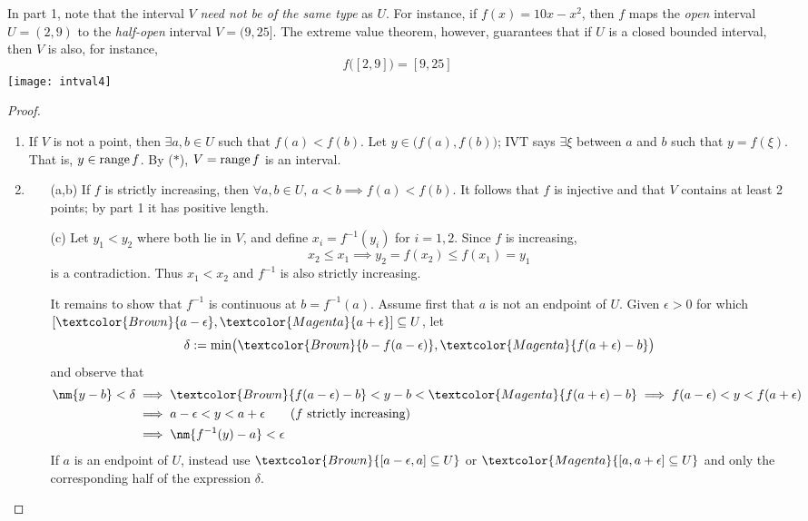 \begin{example}[lower separated=false, sidebyside, sidebyside align=top seam, sidebyside gap=0pt, righthand width=0.3\linewidth]{}{}
	In part 1, note that the interval $V$ \emph{need not be of the same type} as $U$. For instance, if $f(x)=10x-x^2$, then $f$ maps the \emph{open} interval $U=(2,9)$ to the \emph{half-open} interval $V=(9,25]$.\smallbreak
	The extreme value theorem, however, guarantees that if $U$ is a closed bounded interval, then $V$ is also, for instance,
	\[
		f\bigl([2,9]\bigr)=[9,25]
	\]
	\tcblower
	\flushright\texttt{[image: intval4]}
\end{example}


\begin{proof}
\begin{enumerate}
  \item If $V$ is not a point, then $\exists a,b\in U$ such that $f(a)<f(b)$. Let $y\in\bigl(f(a),f(b)\bigr)$; IVT says $\exists\xi$ between $a$ and $b$ such that $y=f(\xi)$. That is, $y\in \operatorname{range} f$. By ($\ast$), $V=\operatorname{range} f$ is an interval.
  \item\begin{enumerate}
    \item[(a,b)] If $f$ is strictly increasing, then $\forall a,b\in U,\ a<b\implies f(a)<f(b)$. It follows that $f$ is injective and that $V$ contains at least 2 points; by part 1 it has positive length.
    \item[(c)] Let $y_1<y_2$ where both lie in $V$, and define $x_i=f^{-1}(y_i)$ for $i=1,2$. Since $f$ is increasing,
		\[
			x_2\le x_1\implies y_2=f(x_2)\le f(x_1)=y_1
		\]
		is a contradiction. Thus $x_1<x_2$ and $f^{-1}$ is also strictly increasing.\par
		It remains to show that $f^{-1}$ is continuous at $b=f^{-1}(a)$. Assume first that $a$ is not an endpoint of $U$. Given $\epsilon>0$ for which $[\textcolor{Brown}{a-\epsilon},\textcolor{Magenta}{a+\epsilon}]\subseteq U$, let
		\[\delta:=\min\bigl(\textcolor{Brown}{b-f(a-\epsilon)},\textcolor{Magenta}{f(a+\epsilon)-b}\bigr)\]
		and observe that
		\begin{align*}
			\nm{y-b}<\delta&\implies \textcolor{Brown}{f(a-\epsilon)-b}<y-b<\textcolor{Magenta}{f(a+\epsilon)-b}%
			\implies f(a-\epsilon)<y<f(a+\epsilon)\\
			&\implies a-\epsilon<y<a+\epsilon \tag{$f$ strictly increasing}\\
			&\implies \nm{f^{-1}(y)-a}<\epsilon
		\end{align*}
		If $a$ is an endpoint of $U$, instead use $\textcolor{Brown}{[a-\epsilon,a]\subseteq U}$ or $\textcolor{Magenta}{[a,a+\epsilon]\subseteq U}$ and only the corresponding half of the expression $\delta$.\qedhere
  \end{enumerate}
\end{enumerate}
\end{proof}



